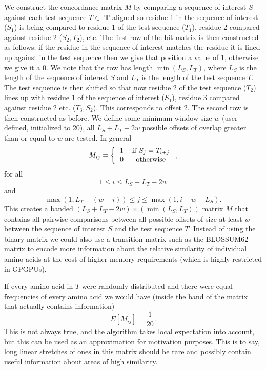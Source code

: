 \documentclass[phd,tocprelim]{cornell}
\begin{document}
We construct the concordance matrix $M$ by comparing a sequence of interest $S$ against each test sequence $T \in$ \textbf{T} aligned so residue 1 in the sequence of interest ($S_{1}$) is being compared to residue 1 of the test sequence ($T_{1}$), residue 2 compared against residue 2 ($S_{2},T_{2}$), etc. The first row of the bit-matrix is then constructed as follows: if the residue in the sequence of interest matches the residue it is lined up against in the test sequence then we give that position a value of 1, otherwise we give it a 0. We note that the row has length $\min(L_{S},L_{T})$, where $L_{S}$ is the length of the sequence of interest $S$ and $L_{T}$ is the length of the test sequence $T$. The test sequence is then shifted so that now residue 2 of the test sequence ($T_{2}$) lines up with residue 1 of the sequence of interest ($S_{1}$), residue 3 compared against residue 2 etc. ($T_{3},S_{2}$). This corresponds to offset 2. The second row is then constructed as before. We define some minimum window size $w$ (user defined, initialized to 20), all $L_{S} + L_{T}-2w$ possible offsets of overlap greater than or equal to $w$ are tested. In general
\begin{equation}
    M_{ij} = \left\{\begin{tabular}{cc} 1 & if $S_{j} = T_{i+j}$ \\ 0 & otherwise \end{tabular}\right.,
\end{equation}
for all
\begin{equation}
    1 \leq i \leq L_{S} + L_{T}-2w
\end{equation}
and
\begin{equation}
    \max(1,L_{T} - (w+i)) \leq j \leq \max(1,i+w-L_{S}).
\end{equation}
This creates a banded $(L_{S} + L_{T}-2w) \times (\min(L_{S},L_{T}))$ matrix $M$ that contains all pairwise comparisons between all possible offsets of size at least $w$ between the sequence of interest $S$ and the test sequence $T$. Instead of using the binary matrix we could also use a transition matrix such as the BLOSSUM62 matrix \cite{Henikoff1992} to encode more information about the relative similarity of individual amino acids at the cost of higher memory requirements (which is highly restricted in GPGPUs).

If every amino acid in $T$ were randomly distributed and there were equal frequencies of every amino acid we would have (inside the band of the matrix that actually contains information)
\begin{equation}
    E[M_{ij}] = \frac{1}{20}.
\end{equation}
This is not always true, and the algorithm takes local expectation into account, but this can be used as an approximation for motivation purposes. This is to say, long linear stretches of ones in this matrix should be rare and possibly contain useful information about areas of high similarity.
\end{document}
